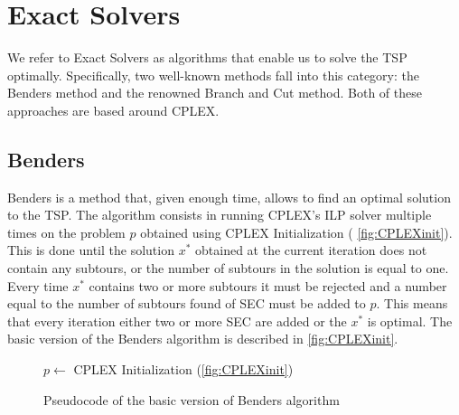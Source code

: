 \chapter{Exact Solvers}

We refer to Exact Solvers as algorithms that enable us to solve the TSP optimally.
Specifically, two well-known methods fall into this category: the Benders method and the renowned Branch and Cut method.
Both of these approaches are based around CPLEX.

\section{Benders}

Benders is a method that, given enough time, allows to find an optimal solution to the TSP.
The algorithm consists in running CPLEX's ILP solver multiple times on the problem $p$ obtained using CPLEX Initialization (\figurename{ \ref{fig:CPLEXinit}}).
This is done until the solution $x^*$ obtained at the current iteration does not contain any subtours, or the number of subtours in the solution is equal to one.
Every time $x^*$ contains two or more subtours it must be rejected and a number equal to the number of subtours found of SEC must be added to $p$.
This means that every iteration either two or more SEC are added or the $x^*$ is optimal.
The basic version of the Benders algorithm is described in \figurename{ \ref{fig:CPLEXinit}}.

\begin{figure}[htbp]
	\begin{algorithm}[H]
		\vspace{2mm}
		$p \gets$ CPLEX Initialization (\ref{fig:CPLEXinit})\\
	\end{algorithm}
	\caption{Pseudocode of the basic version of Benders algorithm} \label{fig:benders}
\end{figure}

